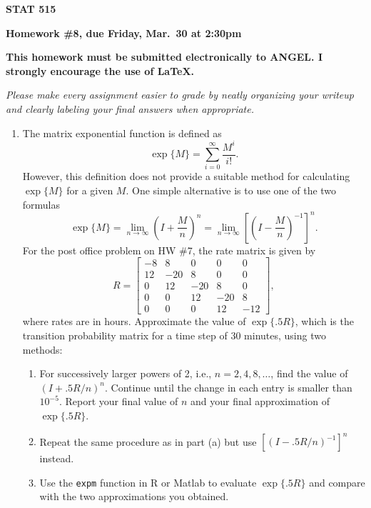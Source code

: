 \documentclass{article}
\begin{document}
\begin{center}
{\bf STAT 515}

{\bf Homework \#8, due Friday, Mar.~30 at 2:30pm}

{\bf This homework must be submitted electronically to ANGEL. I strongly
encourage the use of \LaTeX.}

\end{center}

{\it Please make every assignment easier to grade by neatly organizing your
writeup and clearly labeling your final answers when appropriate.}

\begin{enumerate}

  \item The matrix exponential function is defined as
  \[
  \exp\{ M \} = \sum_{i=0}^\infty \frac{M^i}{i!}.
  \]
  However, this definition does not provide a suitable method for calculating
  $\exp\{M\}$ for a given $M$. One simple alternative is to use one of the two
  formulas
  \[
  \exp \{ M \} = \lim_{n\to\infty} \left( I + \frac{M}{n} \right) ^n
  = \lim_{n\to\infty} \left[ \left(I - \frac{M}{n} \right)^{-1} \right]^n.
  \]
  For the post office problem on HW \#7, the rate matrix is given by
  \[
  R = \begin{bmatrix}
  -8 & 8 & 0 & 0 & 0 \\
  12 & -20 & 8 & 0 & 0 \\
  0 & 12 & -20 & 8 & 0 \\
  0 & 0 & 12 & -20 & 8 \\
  0 & 0 & 0 & 12 & -12
  \end{bmatrix},
  \]
  where rates are in hours. Approximate the value of $\exp \{.5R\}$, which is
  the transition probability matrix for a time step of 30 minutes, using two
  methods:

    \begin{enumerate}

    \item For successively larger powers of 2, i.e., $n=2, 4, 8, \ldots$, find
    the value of $( I + .5R/n) ^n$. Continue until the change in each entry is
    smaller than $10^{-5}$. Report your final value of $n$ and your final
    approximation of $\exp \{.5R\}$.

    \item Repeat the same procedure as in part (a) but use $[(I-.5R/n)^{-1}]^n$
    instead.

    \item Use the {\tt expm} function in R or Matlab to evaluate $\exp \{.5R\}$
    and compare with the two approximations you obtained.
    

\end{enumerate}
\end{enumerate}
\end{document}
